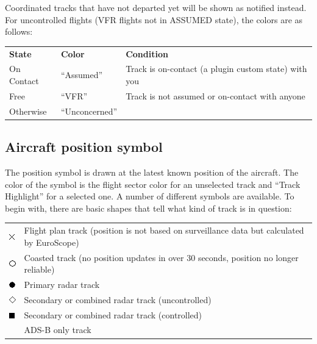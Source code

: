 \documentclass[11pt,a4paper,oldfontcommands]{memoir}
\begin{document}
Coordinated tracks that have not departed yet will be shown as notified instead.\\

For uncontrolled flights (VFR flights not in ASSUMED state), the colors are as follows:\\
\begin{tabular}{p{5cm}p{5cm}p{5cm}}
\textbf{State}  & \textbf{Color}    & \textbf{Condition}
\\On Contact    & “Assumed”         & Track is on-contact (a plugin custom state) with you
\\Free          & “VFR”             & Track is not assumed or on-contact with anyone
\\Otherwise     & “Unconcerned”     &
\end{tabular}

\subsection{Aircraft position symbol}
The position symbol is drawn at the latest known position of the aircraft. The color of the symbol is the
flight sector color for an unselected track and “Track Highlight” for a selected one. A number of different
symbols are available. To begin with, there are basic shapes that tell what kind of track is in question:

\begin{tabular}{p{5cm}p{5cm}}
\includegraphics{img/rps_fpasd.png} & Flight plan track (position is not based on surveillance data but calculated by EuroScope)
\\\includegraphics{img/rps_coast.png} & Coasted track (no position updates in over 30 seconds, position no longer reliable)
\\\includegraphics{img/rps_psr.png} & Primary radar track
\\\includegraphics{img/rps_sec.png} & Secondary or combined radar track (uncontrolled)
\\\includegraphics{img/rps_psr+ssr.png} & Secondary or combined radar track (controlled)
\\ & ADS-B only track
\end{tabular}
\end{document}
